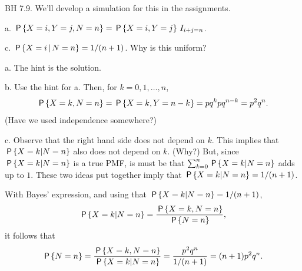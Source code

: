 \begin{exercise}
BH 7.9. We'll develop a simulation for this in the assignments.
\begin{hint}
a. $\P{X=i, Y=j, N=n} = \P{X=i, Y=j} \1{i+j=n}$.

c. $\P{X=i\given N=n} = 1/(n+1)$. Why is this uniform?
\end{hint}
\begin{solution}
a. The hint is the solution.

b. Use the hint for a. Then, for $k=0, 1, \ldots, n$,
\begin{equation*}
\P{X=k, N=n} = \P{X=k, Y=n-k} = pq^k p q^{n-k} = p^2 q^{n}.
\end{equation*}
(Have we used independence somewhere?)

c. Observe that the right hand side does not depend on $k$. This implies that $\P{X=k|N=n}$  also does not depend on $k$. (Why?) But, since $\P{X=k|N=n}$ is a true PMF,  is must be that $\sum_{k=0}^{n}\P{X=k|N=n}$ adds up to $1$. These two ideas put together imply that
$\P{X=k|N=n} = 1/(n+1)$.

With Bayes' expression, and using that  $\P{X=k|N=n} = 1/(n+1)$,
\begin{equation*}
\P{X=k|N=n} = \frac{\P{X=k, N=n}}{\P{N=n}},
\end{equation*}
it follows that
\begin{equation*}
\P{N=n} = \frac{\P{X=k, N=n}}{\P{X=k|N=n}} = \frac{p^2q^n}{1/(n+1)} = (n+1) p^2q^{n}.
\end{equation*}
\end{solution}
\end{exercise}

